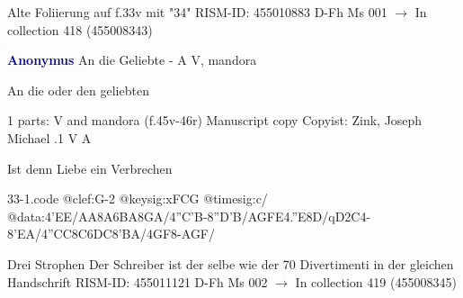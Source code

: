 \documentclass[twocolumn]{book}
\begin{document}
\newline Alte Foliierung auf f.33v mit "34"
\newline RISM-ID: 455010883
\newline D-Fh  Ms 001
\newline $\rightarrow$ In collection 418 (455008343)
      
\newline \par \vspace{7pt} \textcolor{darkblue}{\textbf{Anonymus  }}
\newline An die Geliebte - A
\newline V, mandora
\newline \begin{itshape}[heading, f.45v:] An die oder den geliebten\end{itshape} 
\newline \textcolor{darkblue}{}  1 parts: V and mandora  (f.45v-46r)
\newline Manuscript copy
\newline Copyist: Zink, Joseph Michael
.1  V  A
\newline \begin{footnotesize} Ist denn Liebe ein Verbrechen \end{footnotesize}  
\begin{filecontents*}{33-1.code}
@clef:G-2
@keysig:xFCG
@timesig:c/
@data:4'EE/AA{8A6BA}8GA/4''C'B-8''D'B/{AG}{FE}4.''E8D/qD2C4-8'EA/4''CC{8C6DC}8'BA/4GF8-AGF/
\end{filecontents*}
\newline
%

\newline Drei Strophen
\newline Der Schreiber ist der selbe wie der 70 Divertimenti in der gleichen Handschrift
\newline RISM-ID: 455011121
\newline D-Fh  Ms 002
\newline $\rightarrow$ In collection 419 (455008345)
      
\end{document}
